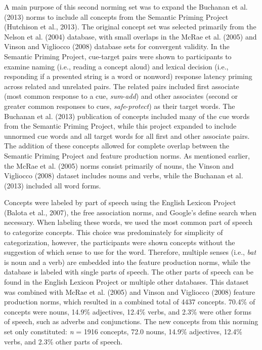 \documentclass[english,,man]{apa6}
\theoremstyle{definition}
\theoremstyle{definition}
\theoremstyle{definition}
\theoremstyle{remark}
\begin{document}
A main purpose of this second norming set was to expand the Buchanan et
al. (2013) norms to include all concepts from the Semantic Priming
Project (Hutchison et al., 2013). The original concept set was selected
primarily from the Nelson et al. (2004) database, with small overlaps in
the McRae et al. (2005) and Vinson and Vigliocco (2008) database sets
for convergent validity. In the Semantic Priming Project, cue-target
pairs were shown to participants to examine naming (i.e., reading a
concept aloud) and lexical decision (i.e., responding if a presented
string is a word or nonword) response latency priming across related and
unrelated pairs. The related pairs included first associate (most common
response to a cue, \emph{sum}-\emph{add}) and other associates (second
or greater common responses to cues, \emph{safe}-\emph{protect}) as
their target words. The Buchanan et al. (2013) publication of concepts
included many of the cue words from the Semantic Priming Project, while
this project expanded to include unnormed cue words and all target words
for all first and other associate pairs. The addition of these concepts
allowed for complete overlap between the Semantic Priming Project and
feature production norms. As mentioned earlier, the McRae et al. (2005)
norms consist primarily of nouns, the Vinson and Vigliocco (2008)
dataset includes nouns and verbs, while the Buchanan et al. (2013)
included all word forms.

Concepts were labeled by part of speech using the English Lexicon
Project (Balota et al., 2007), the free association norms, and Google's
define search when necessary. When labeling these words, we used the
most common part of speech to categorize concepts. This choice was
predominately for simplicity of categorization, however, the
participants were shown concepts without the suggestion of which sense
to use for the word. Therefore, multiple senses (i.e., \emph{bat} is
noun and a verb) are embedded into the feature production norms, while
the database is labeled with single parts of speech. The other parts of
speech can be found in the English Lexicon Project or multiple other
databases. This dataset was combined with McRae et al. (2005) and Vinson
and Vigliocco (2008) feature production norms, which resulted in a
combined total of 4437 concepts. 70.4\% of concepts were nouns, 14.9\%
adjectives, 12.4\% verbs, and 2.3\% were other forms of speech, such as
adverbs and conjunctions. The new concepts from this norming set only
constituted: \emph{n} = 1916 concepts, 72.0 nouns, 14.9\% adjectives,
12.4\% verbs, and 2.3\% other parts of speech.
\end{document}
